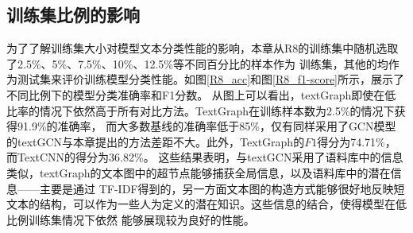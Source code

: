 \subsection{训练集比例的影响}
为了了解训练集大小对模型文本分类性能的影响，本章从R8的训练集中随机选取了2.5\%、5\%、7.5\%、10\%、12.5\%等不同百分比的样本作为
训练集，其他的均作为测试集来评价训练模型分类性能。如图\ref{R8_acc}和图\ref{R8_f1-score}所示，展示了不同比例下的模型分类准确率和F1分数。
从图上可以看出，textGraph即使在低比率的情况下依然高于所有对比方法。TextGraph在训练样本数为2.5\%的情况下获得91.9\%的准确率，
而大多数基线的准确率低于85\%，仅有同样采用了GCN模型的textGCN与本章提出的方法差距不大。此外，TextGraph的$F1$得分为74.71\%，而TextCNN的得分为36.82\%。
这些结果表明，与textGCN采用了语料库中的信息类似，textGraph的文本图中的超节点能够捕获全局信息，以及语料库中的潜在信息——主要是通过
TF-IDF得到的，另一方面文本图的构造方式能够很好地反映短文本的结构，可以作为一些人为定义的潜在知识。这些信息的结合，使得模型在低比例训练集情况下依然
能够展现较为良好的性能。


